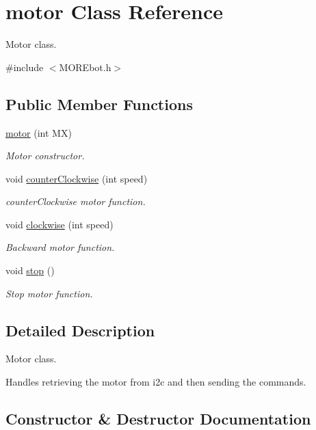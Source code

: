 \hypertarget{classmotor}{}\section{motor Class Reference}
\label{classmotor}


Motor class.  




{\ttfamily \#include $<$M\+O\+R\+Ebot.\+h$>$}

\subsection*{Public Member Functions}
\begin{DoxyCompactItemize}
\item 
\mbox{\hyperlink{classmotor_ae56a6d927333ea6aea189de020179dc8}{motor}} (int MX)
\begin{DoxyCompactList}\small\item\em Motor constructor. \end{DoxyCompactList}\item 
void \mbox{\hyperlink{classmotor_a25458366e1d0097574640c68fbc618b3}{counter\+Clockwise}} (int speed)
\begin{DoxyCompactList}\small\item\em counter\+Clockwise motor function. \end{DoxyCompactList}\item 
void \mbox{\hyperlink{classmotor_aa430473ab7a4844313c74f25e8ad680b}{clockwise}} (int speed)
\begin{DoxyCompactList}\small\item\em Backward motor function. \end{DoxyCompactList}\item 
void \mbox{\hyperlink{classmotor_a9395e462f009a775c5fbe11f4c39150c}{stop}} ()
\begin{DoxyCompactList}\small\item\em Stop motor function. \end{DoxyCompactList}\end{DoxyCompactItemize}


\subsection{Detailed Description}
Motor class. 

Handles retrieving the motor from i2c and then sending the commands. 

\subsection{Constructor \& Destructor Documentation}
\mbox{\label{classmotor_ae56a6d927333ea6aea189de020179dc8}} 
